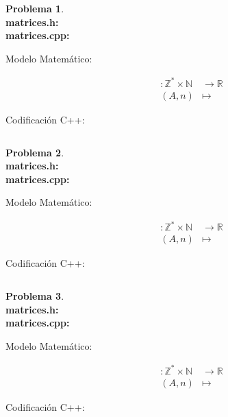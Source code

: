 \documentclass{article}
\theoremstyle{plain}
\theoremstyle{definition}
\newtheorem{problem}{Problema}
\begin{document}
\begin{problem} \emph{}
\\
\textbf{matrices.h:}\ \\
\textbf{matrices.cpp:}\ 
%
\begin{description}
\item[Modelo Matemático:]
%
\begin{align*}
: \mathbb{Z}^*\times\mathbb{N} &\to \mathbb{R}\\
(A,n) &\mapsto 
\end{align*}
%
\item[Codificación \textsf{C++}:]\hfill
%
\begin{verbatim}

\end{verbatim}
\end{description}
\end{problem}

\begin{problem} \emph{}
\\
\textbf{matrices.h:}\ \\
\textbf{matrices.cpp:}\ 
%
\begin{description}
\item[Modelo Matemático:]
%
\begin{align*}
: \mathbb{Z}^*\times\mathbb{N} &\to \mathbb{R}\\
(A,n) &\mapsto 
\end{align*}
%
\item[Codificación \textsf{C++}:]\hfill
%
\begin{verbatim}

\end{verbatim}
\end{description}
\end{problem}

\begin{problem} \emph{}
\\
\textbf{matrices.h:}\ \\
\textbf{matrices.cpp:}\ 
%
\begin{description}
\item[Modelo Matemático:]
%
\begin{align*}
: \mathbb{Z}^*\times\mathbb{N} &\to \mathbb{R}\\
(A,n) &\mapsto 
\end{align*}
%
\item[Codificación \textsf{C++}:]\hfill
%
\begin{verbatim}

\end{verbatim}
\end{description}
\end{problem}
\end{document}

